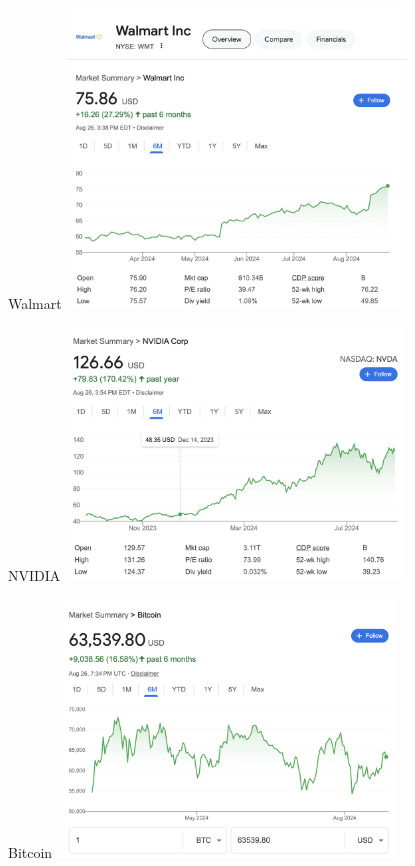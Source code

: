 \documentclass[12pt]{beamer}
\begin{document}
\begin{frame}{Walmart}
	\centering
	\includegraphics[width=9cm]{wmt.png}
\end{frame}
\begin{frame}{NVIDIA}
	\centering
	\includegraphics[width=9cm]{nvda.png}
\end{frame}
\begin{frame}{Bitcoin}
	\centering
	\includegraphics[width=9cm]{btc.png}
\end{frame}
\end{document}
